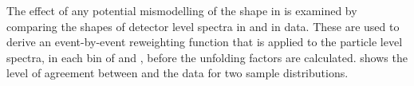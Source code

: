 The effect of any potential mismodelling of the \xs shape in \MC is examined by
comparing the shapes of detector level spectra in \MC and in data. These are
used to derive an event-by-event reweighting function that is applied to the
\MC particle level spectra, in each bin of \rap and \pT, before the unfolding factors are calculated.
 shows the level of agreement
between \Pythia and the data for two sample distributions.

\begin{figure}[htpb]
  \quad
\end{figure}
